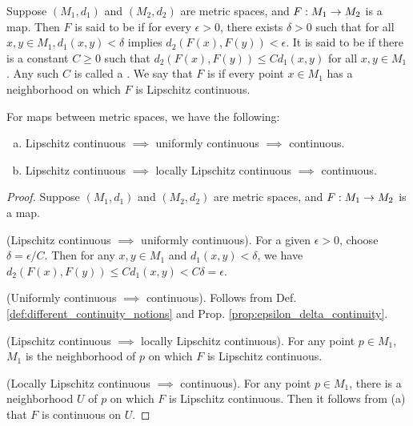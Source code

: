 \documentclass[11pt,a4paper]{article}
\begin{document}
\begin{definition}\label{def:different_continuity_notions}
Suppose $(M_1,d_1)$ and $(M_2,d_2)$ are metric spaces, and $F:M_1\rightarrow M_2$ is a map. Then $F$ is said to be  if for every $\epsilon>0$, there exists $\delta>0$ such that for all $x,y\in M_1,d_1(x,y)<\delta$ implies $d_2(F(x),F(y))<\epsilon$. It is said to be  if there is a constant $C\ge 0$ such that $d_2(F(x),F(y))\le Cd_1(x,y)$ for all $x,y\in M_1$. Any such $C$ is called a . We say that $F$ is  if every point $x\in M_1$ has a neighborhood on which $F$ is Lipschitz continuous.
\end{definition}

\begin{proposition}
For maps between metric spaces, we have the following:
\begin{enumerate}[(a)]
    \item Lipschitz continuous $\implies$ uniformly continuous $\implies$ continuous.
    \item Lipschitz continuous $\implies$ locally Lipschitz continuous $\implies$ continuous.
\end{enumerate}
\end{proposition}

\begin{proof}
Suppose $(M_1,d_1)$ and $(M_2,d_2)$ are metric spaces, and $F:M_1\rightarrow M_2$ is a map.

 (Lipschitz continuous $\implies$ uniformly continuous). For a given $\epsilon>0$, choose $\delta = \epsilon/C$. Then for any $x,y\in M_1$ and $d_1(x,y)<\delta$, we have $d_2(F(x),F(y))\le Cd_1(x,y)<C\delta = \epsilon$. 

(Uniformly continuous $\implies$ continuous). Follows from Def. \ref{def:different_continuity_notions} and Prop. \ref{prop:epsilon_delta_continuity}.

 (Lipschitz continuous $\implies$ locally Lipschitz continuous). For any point $p\in M_1$, $M_1$ is the neighborhood of $p$ on which $F$ is Lipschitz continuous.

\noindent(Locally Lipschitz continuous $\implies$ continuous). For any point $p\in M_1$, there is a neighborhood $U$ of $p$ on which $F$ is Lipschitz continuous. Then it follows from (a) that $F$ is continuous on $U$.
\end{proof}
\end{document}
